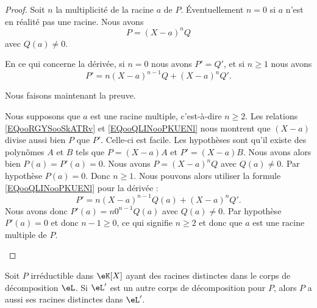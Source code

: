 \begin{proof}
	Soit \( n\) la multiplicité de la racine \( a\) de \( P\). Éventuellement \( n=0\) si \( a\) n'est en réalité pas une racine. Nous avons
	\begin{equation}        \label{EQooRGYSooSkATRv}
		P=(X-a)^nQ
	\end{equation}
	avec \( Q(a)\neq 0\).

	En ce qui concerne la dérivée, si \( n=0\) nous avons \( P'=Q'\), et si \( n\geq 1\) nous avons
	\begin{equation}        \label{EQooQLINooPKUENl}
		P'=n(X-a)^{n-1}Q+(X-a)^nQ'.
	\end{equation}

	Nous faisons maintenant la preuve.
	\begin{subproof}
		Nous supposons que \( a\) est une racine multiple, c'est-à-dire \( n\geq 2\). Les relations \eqref{EQooRGYSooSkATRv} et \eqref{EQooQLINooPKUENl} nous montrent que \( (X-a)\) divise aussi bien \( P\) que \( P'\).
		Celle-ci est facile. Les hypothèses sont qu'il existe des polynômes \( A\) et \( B\) tels que \( P=(X-a)A\) et \( P'=(X-a)B\). Nous avons alors bien \( P(a)=P'(a)=0\).
		Nous avons \( P=(X-a)^nQ\) avec \( Q(a)\neq 0\). Par hypothèse \( P(a)=0\). Donc \( n\geq 1\). Nous pouvons alors utiliser la formule \eqref{EQooQLINooPKUENl} pour la dérivée :
		\begin{equation}
			P'=n(X-a)^{n-1}Q(a)+(X-a)^nQ'.
		\end{equation}
		Nous avons donc \( P'(a)=n 0^{n-1}Q(a)\) avec \( Q(a)\neq 0\). Par hypothèse \( P'(a)=0\) et donc \( n-1\geq 0\), ce qui signifie \( n\geq 2\) et donc que \( a\) est une racine multiple de \( P\).
	\end{subproof}
\end{proof}


\begin{proposition}
	Soit \( P\) irréductible dans \( \eK[X]\) ayant des racines distinctes dans le corps de décomposition \( \eL\). Si \( \eL'\) est un autre corps de décomposition pour \( P\), alors \( P\) a aussi ses racines distinctes dans \( \eL'\).
\end{proposition}

